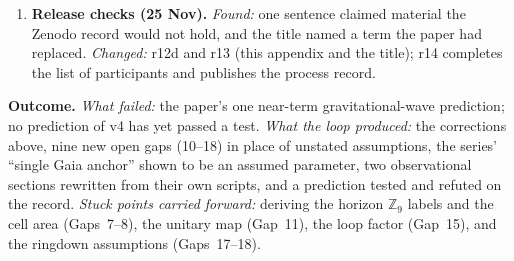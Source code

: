 \documentclass[11pt,a4paper]{article}
\begin{document}
\begin{enumerate}[leftmargin=*, label=\textbf{T\arabic*.}, itemsep=3pt]
    had not done and proposed paper text built on them. The author cancelled Gemini's planned
    informed re-check and used none of its suggested text: a false claim caught at the human
    decision step. \emph{Decision:} the author adopted the findings (options chosen on
    19 and 21 November). \emph{Changed:} r12--r12c: $\eta_{\rm diff}$ relabelled an assumed
    parameter (the ringdown and entropy results do not depend on it); claims recast as
    proposals with their gaps named; an addendum to the run record, which leaves the record
    and the EXCLUDED verdict unchanged. \emph{Fed forward:} the release checks.
  \item \textbf{Release checks (25 Nov).} \emph{Found:} one sentence claimed material the
    Zenodo record would not hold, and the title named a term the paper had replaced.
    \emph{Changed:} r12d and r13 (this appendix and the title); r14 completes the list of
    participants and publishes the process record.
\end{enumerate}

\noindent\textbf{Outcome.} \emph{What failed:} the paper's one near-term gravitational-wave
prediction; no prediction of v4 has yet passed a test. \emph{What the loop produced:} the
corrections above, nine new open gaps (10--18) in place of unstated assumptions, the
series' ``single Gaia anchor'' shown to be an assumed parameter, two observational sections
rewritten from their own scripts, and a prediction tested and refuted on the record. \emph{Stuck points carried forward:} deriving the horizon
$\mathbb{Z}_9$ labels and the cell area (Gaps~7--8), the unitary map (Gap~11), the loop
factor (Gap~15), and the ringdown assumptions (Gaps~17--18).
\end{document}
